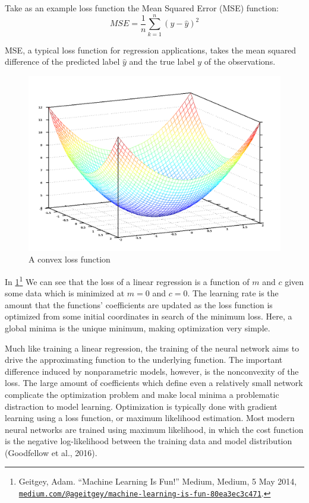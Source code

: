 \documentclass[12pt,twoside]{reedthesis}
\begin{document}
Take as an example loss function the Mean Squared Error (MSE) function:
\[
MSE = \frac{1}{n} \sum_{k=1}^n  (y - \hat y)^2
\]

MSE, a typical loss function for regression applications, takes the mean
squared difference of the predicted label \(\hat y\) and the true label
\(y\) of the observations.
\begin{figure}
\includegraphics[width=0.95\linewidth]{figure/optimize} \caption{A convex loss function}\label{fig:optimize}
\end{figure}
In \ref{fig:optimize}\footnote{Geitgey, Adam. ``Machine Learning Is
  Fun!'' Medium, Medium, 5 May 2014,
  \href{mailto:medium.com/@ageitgey/machine-learning-is-fun-80ea3ec3c471}{\nolinkurl{medium.com/@ageitgey/machine-learning-is-fun-80ea3ec3c471}}.}
We can see that the loss of a linear regression is a function of \(m\)
and \(c\) given some data which is minimized at \(m = 0\) and \(c = 0\).
The learning rate is the amount that the functions' coefficients are
updated as the loss function is optimized from some initial coordinates
in search of the minimum loss. Here, a global minima is the unique
minimum, making optimization very simple.

Much like training a linear regression, the training of the neural
network aims to drive the approximating function to the underlying
function. The important difference induced by nonparametric models,
however, is the nonconvexity of the loss. The large amount of
coefficients which define even a relatively small network complicate the
optimization problem and make local minima a problematic distraction to
model learning. Optimization is typically done with gradient learning
using a loss function, or maximum likelihood estimation. Most modern
neural networks are trained using maximum likelihood, in which the cost
function is the negative log-likelihood between the training data and
model distribution (Goodfellow et al., 2016).
\end{document}
